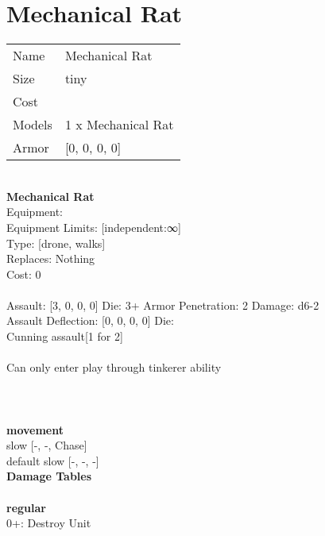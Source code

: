 \pagebreak\pagebreak

\section{ Mechanical Rat }

\begin{tabular}{ll}
  Name & Mechanical Rat \\
  Size & tiny\\
  Cost & \\
  Models & 1 x Mechanical Rat\\
  Armor & [0, 0, 0, 0]\\
\end{tabular}

\noindent \\ 


{\bf Mechanical Rat } \\
Equipment:  \\
Equipment Limits: [independent:∞] \\
Type: [drone, walks] \\
Replaces: Nothing \\
Cost: 0\\
\ \\
Assault: [3, 0, 0, 0] Die: 3+ Armor Penetration: 2 Damage: d6-2 \\
Assault Deflection: [0, 0, 0, 0] Die: \\
\indent Cunning assault[1 for 2]\\ 
 
\ \\
Can only enter play through tinkerer ability\\ 

\ \\
 
\ \\



\ \\ {\bf movement } \\
slow [-, -, Chase] \\
default slow [-, -, -] \\


{\bf Damage Tables} \\
\ \\ {\bf regular } \\
0+: Destroy Unit \\










